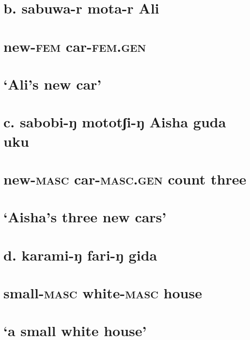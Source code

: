\documentclass[output=paper
,modfonts
,nonflat]{langsci/langscibook}
\begin{document}
\section{\rmfamily} 
\section{  b.    sabuwa-r     mota-r       Ali} 
\section{     new-\textsc{fem}     car-\textsc{fem.gen}} 
\section{    ‘Ali’s new car’}
\section{\rmfamily} 
\section{  c.  sabobi-ŋ     mototʃi-ŋ       Aisha   guda     uku} 
\section{    new-\textsc{masc}  car-\textsc{masc.gen}            count     three}
\section{    ‘Aisha’s three new cars’}
\section{\rmfamily} 
\section{  d.    karami-ŋ   fari-ŋ       gida}
\section{     small-\textsc{masc}  white-\textsc{masc}   house}
\section{      ‘a small white house’}
\section{\rmfamily} 
\end{document}
